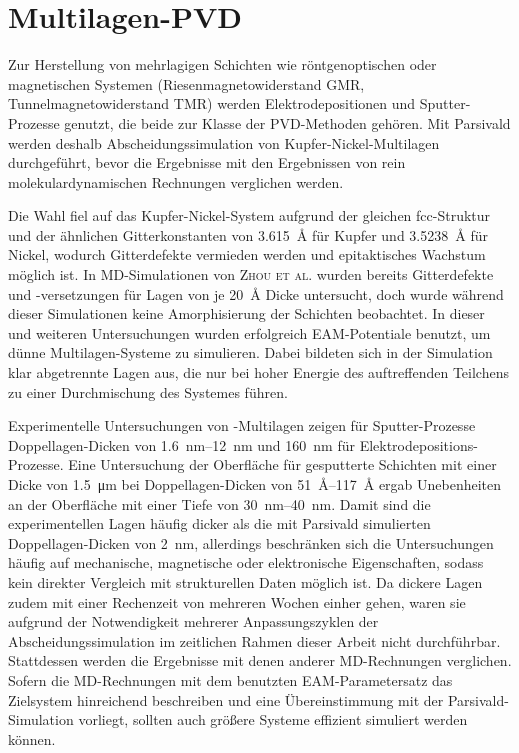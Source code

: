 \section{Multilagen-PVD}
\label{multilayer}

Zur Herstellung von mehrlagigen Schichten wie röntgenoptischen oder magnetischen Systemen (Riesenmagnetowiderstand GMR, Tunnelmagnetowiderstand TMR) werden Elektrodepositionen\cite{yang_pulsed_1995} und Sputter-Prozesse\cite{basrhilia_characterization_2002,cammarata_nanoindentation_1990} genutzt, die beide zur Klasse der PVD-Methoden gehören.
Mit Parsivald werden deshalb Abscheidungssimulation von Kupfer-Nickel-Multilagen durchgeführt, bevor die Ergebnisse mit den Ergebnissen von rein molekulardynamischen Rechnungen verglichen werden.

Die Wahl fiel auf das Kupfer-Nickel-System aufgrund der gleichen fcc-Struktur und der ähnlichen Gitterkonstanten von \SI{3.615}{\angstrom} für Kupfer und \SI{3.5238}{\angstrom} für Nickel, wodurch Gitterdefekte vermieden werden und epitaktisches Wachstum möglich ist\cite{zhou_atomistic_1998}.
In MD-Simulationen von \textsc{Zhou et al.}\cite{zhou_atomistic_1998} wurden bereits Gitterdefekte und -versetzungen für Lagen von je \SI{20}{\angstrom} Dicke untersucht, doch wurde während dieser Simulationen keine Amorphisierung der Schichten beobachtet.
In dieser und weiteren Untersuchungen\cite{zhou_atomic_2001} wurden erfolgreich EAM-Potentiale benutzt, um dünne Multilagen-Systeme zu simulieren.
Dabei bildeten sich in der Simulation klar abgetrennte Lagen aus, die nur bei hoher Energie des auftreffenden Teilchens zu einer Durchmischung des Systemes führen\cite{zhou_atomistic_1998}.

Experimentelle Untersuchungen von -Multilagen zeigen für Sputter-Prozesse Doppel\-lagen-Dicken von \SIrange{1.6}{12}{\nano\meter}\cite{cammarata_nanoindentation_1990} und \SI{160}{\nano\meter} für Elektrodepositions-Prozesse\cite{yang_pulsed_1995}.
Eine Untersuchung der Oberfläche für gesputterte Schichten mit einer Dicke von \SI{1.5}{\micro\meter} bei Doppellagen-Dicken von \SIrange{51}{117}{\angstrom} ergab Unebenheiten an der Oberfläche mit einer Tiefe von \SIrange{30}{40}{\nano\meter}\cite{barshilia_characterization_2002}.
Damit sind die experimentellen Lagen häufig dicker als die mit Parsivald simulierten Doppellagen-Dicken von \SI{2}{\nano\meter}, allerdings beschränken sich die Untersuchungen häufig auf mechanische, magnetische oder elektronische Eigenschaften, sodass kein direkter Vergleich mit strukturellen Daten möglich ist.
Da dickere Lagen zudem mit einer Rechenzeit von mehreren Wochen einher gehen, waren sie aufgrund der Notwendigkeit mehrerer Anpassungszyklen der Abscheidungssimulation im zeitlichen Rahmen dieser Arbeit nicht durchführbar.
Stattdessen werden die Ergebnisse mit denen anderer MD-Rechnungen verglichen.
Sofern die MD-Rechnungen mit dem benutzten EAM-Parametersatz das Zielsystem hinreichend beschreiben und eine Übereinstimmung mit der Parsivald-Simulation vorliegt, sollten auch größere Systeme effizient simuliert werden können.

